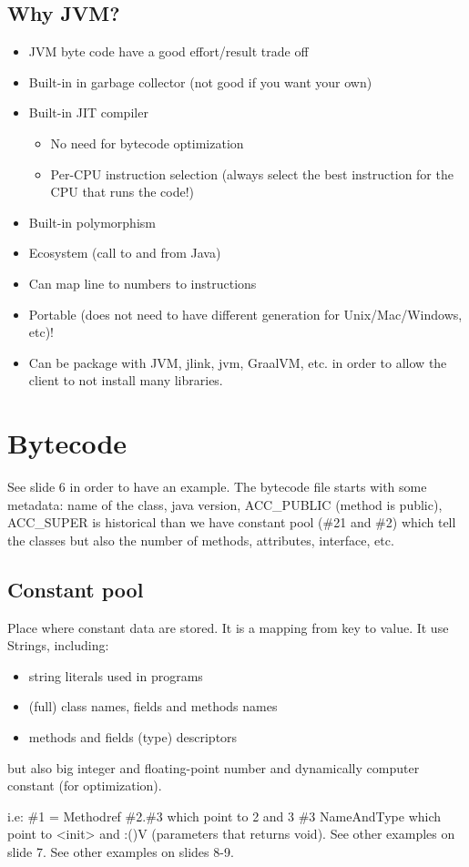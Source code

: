 \subsection{Why JVM?}
\begin{itemize}
    \item JVM byte code have a good effort/result trade off
    \item Built-in in garbage collector (not good if you want your own)
    \item Built-in JIT compiler
    \begin{itemize}
        \item No need for bytecode optimization
        \item Per-CPU instruction selection (always select the best instruction
        for the CPU that runs the code!)
    \end{itemize}
    \item Built-in polymorphism
    \item Ecosystem (call to and from Java)
    \item Can map line to numbers to instructions
    \item Portable (does not need to have different generation for Unix/Mac/Windows, etc)!
    \item Can be package with JVM, jlink, jvm, GraalVM, etc. in order to allow
    the client to not install many libraries.
\end{itemize}
\section{Bytecode}
See slide 6 in order to have an example. The bytecode file starts with some
metadata: name of the class, java version, ACC\_PUBLIC (method is public),
ACC\_SUPER is historical than we have constant pool (\#21 and \#2) which tell the
classes but also the number of methods, attributes, interface, etc.
\subsection{Constant pool}
\theoremstyle{definition}
\begin{definition}
    Place where constant data are stored. It is a mapping from key to value.
    It use Strings, including:
    \begin{itemize}
        \item string literals used in programs
        \item (full) class names, fields and methods names
        \item methods and fields (type) descriptors
    \end{itemize}
    but also big integer and floating-point number and dynamically computer
    constant (for optimization).
\end{definition}
i.e: \#1 = Methodref \#2.\#3 which point to 2 and 3 \#3 NameAndType which point to
<init> and :()V (parameters that returns void). See other examples on slide 7.
See other examples on slides 8-9. 

